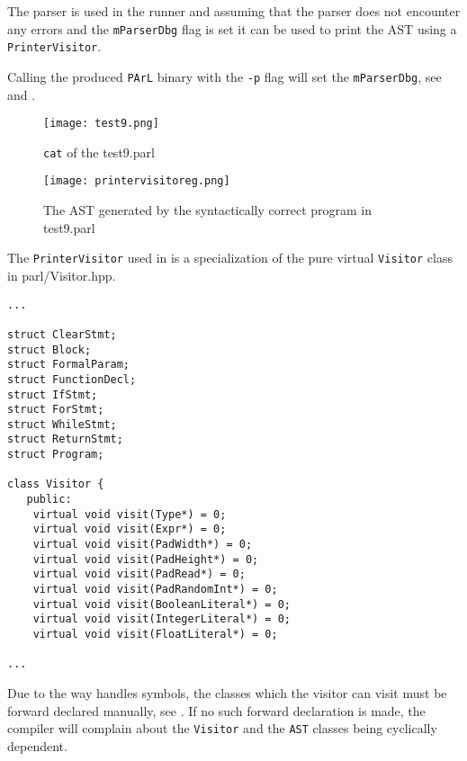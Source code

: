 The parser is used in the runner and assuming that the parser
does not encounter any errors and the \texttt{mParserDbg} flag
is set it can be used to print the AST using a
\texttt{PrinterVisitor}.



Calling the produced \texttt{PArL} binary with the \texttt{-p}
flag will set the \texttt{mParserDbg}, see  and
.

\begin{figure}[H]
\centering
\texttt{[image: test9.png]}
\caption{\texttt{cat} of the test9.parl}
\label{fig:test9}
\end{figure}

\begin{figure}[H]
\centering
\texttt{[image: printervisitoreg.png]}
\caption{The AST generated by the syntactically correct program
in test9.parl}
\label{fig:parseeg}
\end{figure}



The \texttt{PrinterVisitor} used in  is
a specialization of the pure virtual \texttt{Visitor} class
in parl/Visitor.hpp.

\begin{lstlisting}[caption={A segment of the pure virtual
\texttt{Visitor} class (parl/Visitor.hpp)},
label=lst:genericvisitor]
...

struct ClearStmt;
struct Block;
struct FormalParam;
struct FunctionDecl;
struct IfStmt;
struct ForStmt;
struct WhileStmt;
struct ReturnStmt;
struct Program;

class Visitor {
   public:
    virtual void visit(Type*) = 0;
    virtual void visit(Expr*) = 0;
    virtual void visit(PadWidth*) = 0;
    virtual void visit(PadHeight*) = 0;
    virtual void visit(PadRead*) = 0;
    virtual void visit(PadRandomInt*) = 0;
    virtual void visit(BooleanLiteral*) = 0;
    virtual void visit(IntegerLiteral*) = 0;
    virtual void visit(FloatLiteral*) = 0;

...
\end{lstlisting}

Due to the way \CC{} handles symbols, the classes which the
visitor can visit must be forward declared manually, see
. If no such forward declaration is
made, the compiler will complain about the \texttt{Visitor} and
the \texttt{AST} classes being cyclically dependent.

